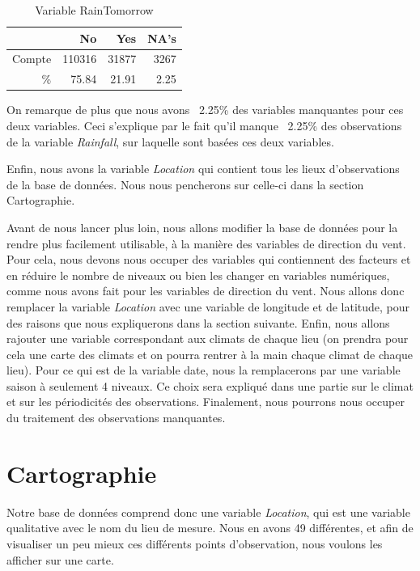 \documentclass{article}
\begin{document}
\begin{table}[htp]
    \centering
    \begin{tabular}{|r||rrr|}
        \hline
        &    No &    Yes &   NA's \\
        \hline
        \hline
        Compte & 110316 &  31877 &   3267 \\
        \% & 75.84 & 21.91 & 2.25 \\
        \hline
    \end{tabular}
    \caption{Variable RainTomorrow}
    \label{table:rain_tomorrow}
\end{table}

On remarque de plus que nous avons ~2.25\% des variables manquantes pour ces deux variables. Ceci s'explique par le fait qu'il manque ~2.25\% des observations de la variable \emph{Rainfall}, sur laquelle sont basées ces deux variables.

Enfin, nous avons la variable \emph{Location} qui contient tous les lieux d'observations de la base de données. Nous nous pencherons sur celle-ci dans la section Cartographie. 

Avant de nous lancer plus loin, nous allons modifier la base de données pour la rendre plus facilement utilisable, à la manière des variables de direction du vent. Pour cela, nous devons nous occuper des variables qui contiennent des facteurs et en réduire le nombre de niveaux ou bien les changer en variables numériques, comme nous avons fait pour les variables de direction du vent. Nous allons donc remplacer la variable \emph{Location} avec une variable de longitude et de latitude, pour des raisons que nous expliquerons dans la section suivante. Enfin, nous allons rajouter une variable correspondant aux climats de chaque lieu (on prendra pour cela une carte des climats et on pourra rentrer à la main chaque climat de chaque lieu). Pour ce qui est de la variable date, nous la remplacerons par une variable saison à seulement 4 niveaux. Ce choix sera expliqué dans une partie sur le climat et sur les périodicités des observations. Finalement, nous pourrons nous occuper du traitement des observations manquantes. 

\section{Cartographie}

Notre base de données comprend donc une variable \emph{Location}, qui est une variable qualitative avec le nom du lieu de mesure. Nous en avons 49 différentes, et afin de visualiser un peu mieux ces différents points d'observation, nous voulons les afficher sur une carte. 
\end{document}
